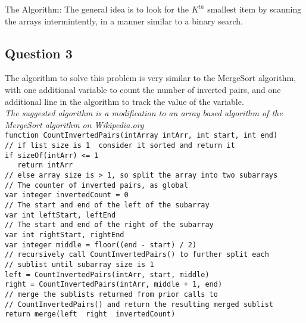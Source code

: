 \documentclass{article}
\begin{document}
\raggedright The Algorithm: The general idea is to look for the $K^{th}$
smallest item by scanning the arrays intermintently, in a manner similar to a
binary search.\\
\vfill

\subsection*{Question 3}
The algorithm to solve this problem is very similar to the MergeSort algorithm,
with one additional variable to count the number of inverted pairs, and one
additional line in the algorithm to track the value of the variable.\\
\textit{The suggested algorithm is a modification to an array based algorithm
of the MergeSort algorithm on Wikipedia.org}\\

\vspace{0.5cm} \texttt{function CountInvertedPairs(intArray intArr, int
start, int end)}\\
\texttt{// if list size is 1\, consider it sorted and return it}\\
\texttt{if sizeOf(intArr) <= 1}\\
\texttt{$\quad$    return intArr}\\
\texttt{// else array size is > 1, so split the array into two subarrays}\\
\texttt{// The counter of inverted pairs, as global}\\
\texttt{var integer invertedCount = 0}\\
\texttt{// The start and end of the left of the subarray }\\
\texttt{var int leftStart, leftEnd }\\
\texttt{// The start and end of the right of the subarray }\\
\texttt{var int rightStart, rightEnd }\\
\texttt{var integer middle = floor((end - start) / 2)}\\
\texttt{// recursively call CountInvertedPairs() to further split each}\\
\texttt{// sublist until subarray size is 1}\\
\texttt{left = CountInvertedPairs(intArr, start, middle)}\\
\texttt{right = CountInvertedPairs(intArr, middle + 1, end)}\\
\texttt{// merge the sublists returned from prior calls to}\\
\texttt{// CountInvertedPairs() and return the resulting merged sublist}\\
\texttt{return merge(left\, right\, invertedCount)}\\
\end{document}
